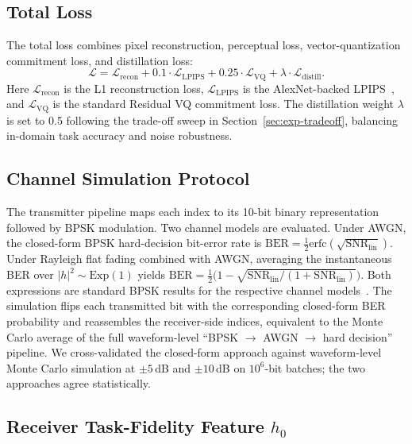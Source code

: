 \documentclass[lettersize,journal]{IEEEtran}
\begin{document}
\subsection{Total Loss}
The total loss combines pixel reconstruction, perceptual loss, vector-quantization commitment loss, and distillation loss:
\begin{equation}
\mathcal{L} = \mathcal{L}_{\mathrm{recon}} + 0.1\cdot\mathcal{L}_{\mathrm{LPIPS}} + 0.25\cdot\mathcal{L}_{\mathrm{VQ}} + \lambda\cdot\mathcal{L}_{\mathrm{distill}}.
\end{equation}
Here $\mathcal{L}_{\mathrm{recon}}$ is the L1 reconstruction loss, $\mathcal{L}_{\mathrm{LPIPS}}$ is the AlexNet-backed LPIPS~\cite{zhang2018lpips}, and $\mathcal{L}_{\mathrm{VQ}}$ is the standard Residual VQ commitment loss. The distillation weight $\lambda$ is set to 0.5 following the trade-off sweep in Section~\ref{sec:exp-tradeoff}, balancing in-domain task accuracy and noise robustness.

\subsection{Channel Simulation Protocol}
\label{sec:method-channel}

The transmitter pipeline maps each index to its 10-bit binary representation followed by BPSK modulation. Two channel models are evaluated. Under AWGN, the closed-form BPSK hard-decision bit-error rate is $\mathrm{BER}=\tfrac{1}{2}\mathrm{erfc}(\sqrt{\mathrm{SNR}_{\mathrm{lin}}})$. Under Rayleigh flat fading combined with AWGN, averaging the instantaneous BER over $|h|^2\sim\mathrm{Exp}(1)$ yields $\mathrm{BER}=\tfrac{1}{2}\bigl(1-\sqrt{\mathrm{SNR}_{\mathrm{lin}}/(1+\mathrm{SNR}_{\mathrm{lin}})}\bigr)$. Both expressions are standard BPSK results for the respective channel models~\cite{proakis}. The simulation flips each transmitted bit with the corresponding closed-form BER probability and reassembles the receiver-side indices, equivalent to the Monte Carlo average of the full waveform-level ``BPSK $\rightarrow$ AWGN $\rightarrow$ hard decision'' pipeline. We cross-validated the closed-form approach against waveform-level Monte Carlo simulation at $\pm 5$\,dB and $\pm 10$\,dB on $10^6$-bit batches; the two approaches agree statistically.

\subsection{Receiver Task-Fidelity Feature $h_0$}
\label{sec:method-h0}
\end{document}
